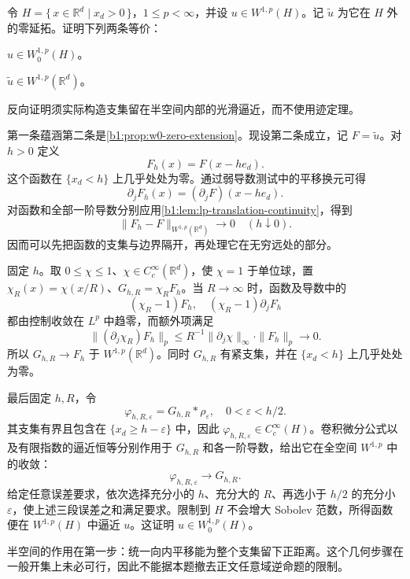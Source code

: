 \begin{exercise}\label{b1:ex:22-halfspace-zero-extension-converse}
令 \(H=\{\,x\in\mathbb R^d\mid x_d>0\,\}\)，\(1\le p<\infty\)，并设 \(u\in W^{1,p}(H)\)。记 \(\widetilde u\) 为它在 \(H\) 外的零延拓。证明下列两条等价：
\begin{equivalences}
\item\label{b1:item:22-halfspace-w0}
\(u\in W_0^{1,p}(H)\)。
\item\label{b1:item:22-halfspace-global-zero-extension}
\(\widetilde u\in W^{1,p}(\mathbb R^d)\)。
\end{equivalences}
反向证明须实际构造支集留在半空间内部的光滑逼近，而不使用迹定理。
\end{exercise}
\begin{solution}
第一条蕴涵第二条是\cref{b1:prop:w0-zero-extension}。现设第二条成立，记 \(F=\widetilde u\)。对 \(h>0\) 定义
\[
 F_h(x)=F(x-he_d).
\]
这个函数在 \(\{x_d<h\}\) 上几乎处处为零。通过弱导数测试中的平移换元可得
\[
 \partial_jF_h(x)=(\partial_jF)(x-he_d).
\]
对函数和全部一阶导数分别应用\cref{b1:lem:lp-translation-continuity}，得到
\[
 \|F_h-F\|_{W^{1,p}(\mathbb R^d)}\longrightarrow0
 \quad(h\downarrow0).
\]
因而可以先把函数的支集与边界隔开，再处理它在无穷远处的部分。

固定 \(h\)。取 \(0\le\chi\le1\)、\(\chi\in C_c^\infty(\mathbb R^d)\)，使 \(\chi=1\) 于单位球，置 \(\chi_R(x)=\chi(x/R)\)、\(G_{h,R}=\chi_RF_h\)。当 \(R\to\infty\) 时，函数及导数中的
\[
 (\chi_R-1)F_h,\quad(\chi_R-1)\partial_jF_h
\]
都由控制收敛在 \(L^p\) 中趋零，而额外项满足
\[
 \|(\partial_j\chi_R)F_h\|_p
 \le R^{-1}\|\partial_j\chi\|_\infty\cdot\|F_h\|_p
 \longrightarrow0.
\]
所以 \(G_{h,R}\to F_h\) 于 \(W^{1,p}(\mathbb R^d)\)。同时 \(G_{h,R}\) 有紧支集，并在 \(\{x_d<h\}\) 上几乎处处为零。

最后固定 \(h,R\)，令
\[
 \varphi_{h,R,\varepsilon}=G_{h,R}*\rho_\varepsilon,
 \quad 0<\varepsilon<h/2.
\]
其支集有界且包含在 \(\{x_d\ge h-\varepsilon\}\) 中，因此 \(\varphi_{h,R,\varepsilon}\in C_c^\infty(H)\)。卷积微分公式以及有限指数的逼近恒等分别作用于 \(G_{h,R}\) 和各一阶导数，给出它在全空间 \(W^{1,p}\) 中的收敛：
\[
 \varphi_{h,R,\varepsilon}\longrightarrow G_{h,R}.
\]
给定任意误差要求，依次选择充分小的 \(h\)、充分大的 \(R\)、再选小于 \(h/2\) 的充分小 \(\varepsilon\)，使上述三段误差之和满足要求。限制到 \(H\) 不会增大 Sobolev 范数，所得函数便在 \(W^{1,p}(H)\) 中逼近 \(u\)。这证明 \(u\in W_0^{1,p}(H)\)。

半空间的作用在第一步：统一向内平移能为整个支集留下正距离。这个几何步骤在一般开集上未必可行，因此不能据本题撤去正文任意域逆命题的限制。
\end{solution}

